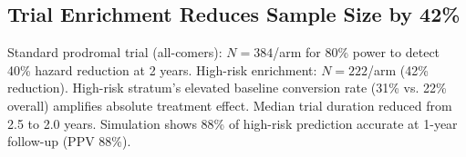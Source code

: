 \subsection{Trial Enrichment Reduces Sample Size by 42\%}
Standard prodromal trial (all-comers): $N=384$/arm for 80\% power to detect 40\% hazard reduction at 2 years. High-risk enrichment: $N=222$/arm (42\% reduction). High-risk stratum's elevated baseline conversion rate (31\% vs. 22\% overall) amplifies absolute treatment effect. Median trial duration reduced from 2.5 to 2.0 years. Simulation shows 88\% of high-risk prediction accurate at 1-year follow-up (PPV 88\%).
